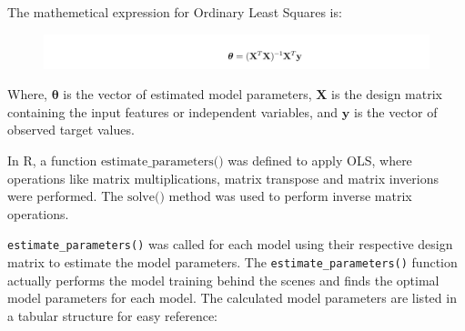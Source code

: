 \documentclass[12pt,a4paper]{article}
\begin{document}


The mathemetical expression for Ordinary Least Squares is: 


\begin{figure}[H]
  \centering
  \includegraphics[width=\textwidth]{p2.png}
\end{figure}

Where, $\boldsymbol{\theta}$ is the vector of estimated model parameters, $\mathbf{X}$ is 
the design matrix containing the input features or independent variables, and
$\mathbf{y}$ is the vector of observed target values.

In R, a function \(\text{estimate\_parameters()}\) was defined to 
apply OLS, where operations like matrix multiplications, 
matrix transpose and matrix inverions were performed. The \( \text{solve()} \) 
method was used to perform inverse matrix operations.


\texttt{estimate\_parameters()} was called for each model using 
their respective design matrix to estimate the model parameters. 
The \texttt{estimate\_parameters()} function actually performs the model training 
behind the scenes and finds the optimal model parameters for each model.
The calculated model parameters are listed in a tabular structure
for easy reference: 
\end{document}
